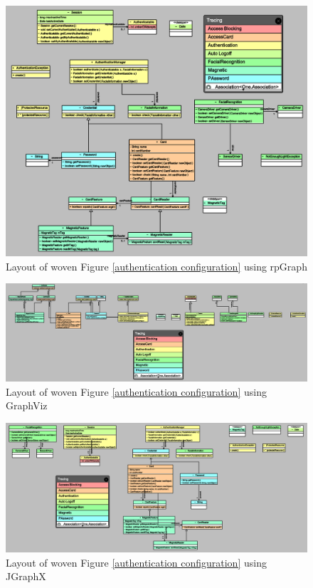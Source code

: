 \begin{figure}
	\centering
    \includegraphics[width=1\linewidth]{biopasswordcardrp.PNG}
	\caption{Layout of woven Figure \ref{authentication configuration} using rpGraph}
    \label{authentication with rpGraph}
\end{figure}
\begin{figure}
	\centering
    \includegraphics[width=1\linewidth]{biopasswordcardgv.PNG}
	\caption{Layout of woven Figure \ref{authentication configuration} using GraphViz}
    \label{authentication with GraphViz}
\end{figure}
\begin{figure}
	\centering
    \includegraphics[width=1\linewidth]{biopasswordcardgx.PNG}
	\caption{Layout of woven Figure \ref{authentication configuration} using JGraphX}
    \label{authentication with JGRaphX}
\end{figure}


